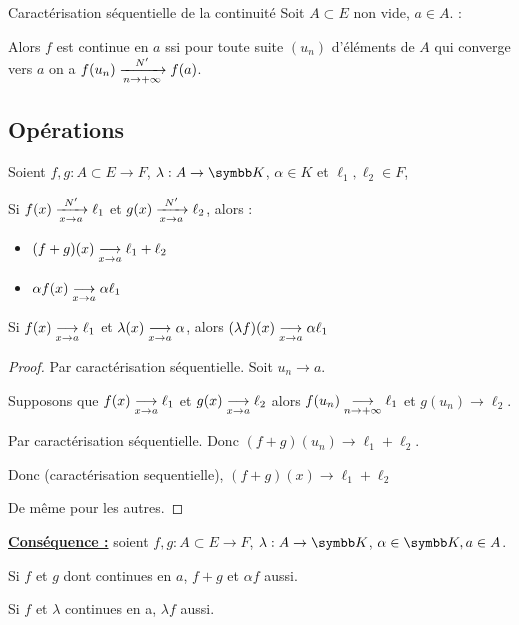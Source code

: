 \begin{theoreme}{Caractérisation séquentielle de la continuité}{}
    Soit $A \subset E$ non vide, $a \in A$. :

    Alors $f$ est continue en $a$ ssi pour toute suite $(u_n)$ d'éléments de $A$ 
    qui converge vers $a$ on a $f(u_n) \limitnorme{N'}{n}{+ \infty} f(a)$.
\end{theoreme}

\subsection{Opérations}

\begin{theoreme}{}{}
    Soient $f, g : A \subset E \to F$, $\lambda : A \to \K$, $\alpha \in K$ et $\ell_1, \ell_2 \in F$, 

    Si $f(x) \limitnorme{N'}{x}{a} \ell_1$ et $g(x) \limitnorme{N'}{x}{a} \ell_2$, alors :
    \begin{itemize}
        \item  $(f + g)(x) \limit x a \ell_1 + \ell_2$
        \item $\alpha f(x) \limit x a \alpha \ell_1$ 
    \end{itemize}

    Si $f(x) \limit x a \ell_1$ et $\lambda(x) \limit x a \alpha$, alors $(\lambda f)(x) \limit x a \alpha \ell_1$
\end{theoreme}


\begin{proof}
    Par caractérisation séquentielle. Soit $u_n \longrightarrow a$. 

    Supposons que $f(x) \limit x a \ell_1$ et $g(x) \limit x a \ell_2$ alors 
    $f(u_n) \limit n {+ \infty} \ell_1$ et $g(u_n) \longrightarrow \ell_2$. 

    Par caractérisation séquentielle. Donc $(f + g)(u_n) \longrightarrow \ell_1 + \ell_2$. 

    Donc (caractérisation sequentielle), $(f + g)(x) \longrightarrow \ell_1 + \ell_2$

    De même pour les autres. 
\end{proof}

\textbf{\uline{Conséquence :}} soient $f, g : A \subset E \to F$, $\lambda : A \to \K$, $\alpha \in \K, a \in A$. 

Si $f$ et $g$ dont continues en $a$, $f + g$ et $\alpha f$ aussi. 

Si $f$ et $\lambda$ continues en a, $\lambda f$ aussi. 


